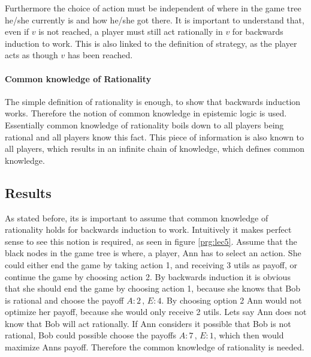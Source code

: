 Furthermore the choice of action must be independent of where in the game tree he/she currently is and how he/she got there.
It is important to understand that, even if $v$ is not reached, a player must still act rationally in $v$ for backwards induction to work. This is also linked to the definition of strategy, as the player acts as though $v$ has been reached.

\paragraph*{Common knowledge of Rationality} The simple definition of rationality is enough, to show that backwards induction works. Therefore the notion of common knowledge in epistemic logic is used. 
Essentially common knowledge of rationality boils down to all players being rational and all players know this fact. This piece of information is also known to all players, which results in an infinite chain of knowledge, which defines common knowledge. 

\subsection{Results}
As stated before, its is important to assume that common knowledge of rationality holds for backwards induction to work. 
Intuitively it makes perfect sense to see this notion is required, as seen in figure \ref{prg:lec5}.
Assume that the black nodes in the game tree is where, a player, Ann has to select an action. She could either end the game by taking action 1, and receiving 3 utils as payoff, or continue the game by choosing action 2. By backwards induction it is obvious that she should end the game by choosing action 1, because she knows that Bob is rational and choose the payoff $A:2 \, ,\, E:4$. By choosing option 2 Ann would not optimize her payoff, because she would only receive 2 utils. Lets say Ann does not know that Bob will act rationally. If Ann considers it possible that Bob is not rational, Bob could possible choose the payoffs $A:7 \, ,\, E:1$, which then would maximize Anns payoff. Therefore the common knowledge of rationality is needed.


